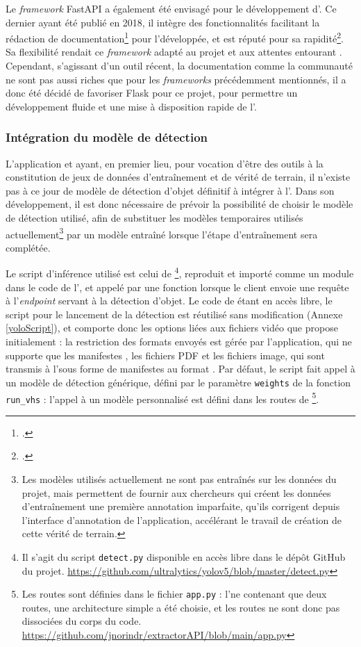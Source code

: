 	Le \textit{framework} FastAPI a également été envisagé pour le développement d'\exapi. Ce dernier ayant été publié en 2018, il intègre des fonctionnalités facilitant la rédaction de documentation\footcite{FastAPIFrameworkPython2023} pour l'\api développée, et est réputé pour sa rapidité\footcite{sandyChoosingDjangoFlask}. Sa flexibilité rendait ce \textit{framework} adapté au projet \eida et aux attentes entourant \exapi. Cependant, s'agissant d'un outil récent, la documentation comme la communauté ne sont pas aussi riches que pour les \textit{frameworks} précédemment mentionnés, il a donc été décidé de favoriser Flask pour ce projet, pour permettre un développement fluide et une mise à disposition rapide de l'\api.
	
	\subsubsection{Intégration du modèle de détection}
	L'application \eida et \exapi ayant, en premier lieu, pour vocation d'être des outils à la constitution de jeux de données d'entraînement et de vérité de terrain, il n'existe pas à ce jour de modèle de détection d'objet définitif à intégrer à l'\api. Dans son développement, il est donc nécessaire de prévoir la possibilité de choisir le modèle de détection utilisé, afin de substituer les modèles temporaires utilisés actuellement\footnote{Les modèles utilisés actuellement ne sont pas entraînés sur les données du projet, mais permettent de fournir aux chercheurs qui créent les données d'entraînement une première annotation imparfaite, qu'ils corrigent depuis l'interface d'annotation de l'application, accélérant le travail de création de cette vérité de terrain.} par un modèle entraîné lorsque l'étape d'entraînement sera complétée.
	
	Le script d’inférence utilisé est celui de \yolov\footnote{Il s'agit du script \texttt{detect.py} disponible en accès libre dans le dépôt GitHub du projet. \url{https://github.com/ultralytics/yolov5/blob/master/detect.py}}, reproduit et importé comme un module dans le code de l'\api, et appelé par une fonction lorsque le client envoie une requête à l'\textit{endpoint} servant à la détection d'objet. Le code de \yolov étant en accès libre, le script pour le lancement de la détection est réutilisé sans modification (Annexe \ref{yoloScript}), et comporte donc les options liées aux fichiers vidéo que \yolo propose initialement : la restriction des formats envoyés est gérée par l'application, qui ne supporte que les manifestes \iiif, les fichiers PDF et les fichiers image, qui sont transmis à l'\api sous forme de manifestes \iiif au format \json. Par défaut, le script fait appel à un modèle de détection \yolov générique, défini par le paramètre \texttt{weights} de la fonction \texttt{run\_vhs} : l'appel à un modèle personnalisé est défini dans les routes de \api\footnote{Les routes sont définies dans le fichier \texttt{app.py} : l'\api ne contenant que deux routes, une architecture simple a été choisie, et les routes ne sont donc pas dissociées du corps du code. \url{https://github.com/jnorindr/extractorAPI/blob/main/app.py}}.
	
